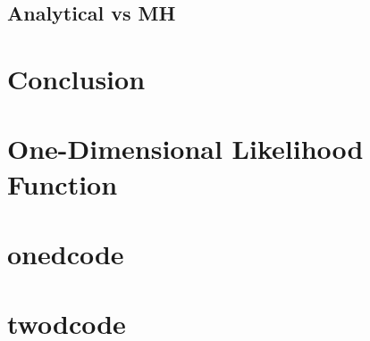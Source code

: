 \documentclass[a4paper,11pt,twoside]{article}
\begin{document}
\subsection{Analytical vs MH}

\section{Conclusion}

\appendix 
\label{appendix}

\section{One-Dimensional Likelihood Function}
\label{sec:likelihood}

\section{onedcode} 
\label{sec:onedcode}

\section{twodcode}
\label{sec:twodcode}

\begin{thebibliography}{10}


\end{thebibliography}
\end{document}
